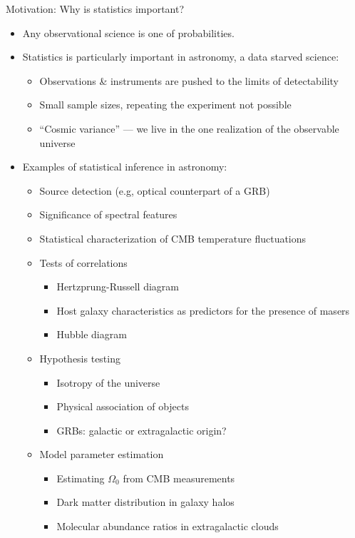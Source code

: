 \documentclass[12pt]{report}
\begin{document}
Motivation: Why is statistics important?
\begin{itemize}
\item Any observational science is one of probabilities.
  
\item Statistics is particularly important in astronomy, a data starved
  science:
  \begin{itemize}
  \item Observations \& instruments are pushed to the limits of
    detectability
    
  \item Small sample sizes, repeating the experiment not possible
    
  \item ``Cosmic variance'' --- we live in the one realization of the
    observable universe
  \end{itemize}
\item Examples of statistical inference in astronomy:
  \begin{itemize}
  \item Source detection (e.g, optical counterpart of a GRB)
    
  \item Significance of spectral features
    
  \item Statistical characterization of CMB temperature fluctuations
    
  \item Tests of correlations
    \begin{itemize}
    \item Hertzprung-Russell diagram
      
    \item Host galaxy characteristics as predictors for the presence of
      masers
      
    \item Hubble diagram
    \end{itemize}
  \item Hypothesis testing
    \begin{itemize}
    \item Isotropy of the universe
      
    \item Physical association of objects
      
    \item GRBs: galactic or extragalactic origin?
    \end{itemize}
  \item Model parameter estimation
    \begin{itemize}
    \item Estimating $\Omega_0$ from CMB measurements
      
    \item Dark matter distribution in galaxy halos
      
    \item Molecular abundance ratios in extragalactic clouds
    \end{itemize}
  \end{itemize}
\end{itemize}
\end{document}
